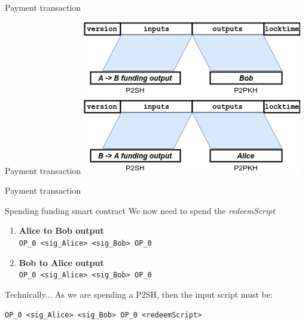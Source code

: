 \documentclass{beamer}
\begin{document}
\begin{frame}{Payment transaction}
 \begin{exampleblock}{Payment transaction}
  \includegraphics[width=\textwidth, height=0.8\textheight, keepaspectratio]{img/bidir_tx_payment.png}
 \end{exampleblock}
\end{frame}
\begin{frame}{Payment transaction}
 \begin{exampleblock}{Spending funding smart contract}
  We now need to spend the \textit{redeemScript}
  \begin{center}
   \begin{enumerate}
    \item \textbf{Alice to Bob output}\\
          \small{\texttt{OP\_0 <sig\_Alice> <sig\_Bob> OP\_0}}
    \item \textbf{Bob to Alice output}\\
          \small{\texttt{OP\_0 <sig\_Alice> <sig\_Bob> OP\_0}}
   \end{enumerate}
  \end{center}
 \end{exampleblock}
 \begin{exampleblock}{Technically...}
  As we are spending a P2SH, then the input script must be:\
  \begin{center}
   \texttt{OP\_0 <sig\_Alice> <sig\_Bob> OP\_0 <redeemScript>}
  \end{center}
 \end{exampleblock}
\end{frame}
\end{document}

